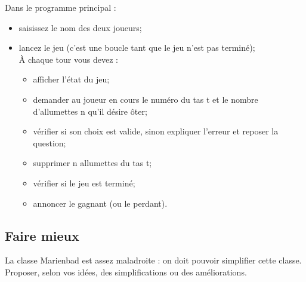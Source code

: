 \documentclass[a4paper,12pt,firamath,article]{nsi}
\begin{document}
Dans le programme principal :
\begin{itemize}
	\item 	saisissez le nom des deux joueurs;

\item lancez le jeu (c’est une boucle tant que le jeu n’est pas terminé);\\
 	À chaque tour vous devez :
\begin{itemize}
	\item 	afficher l'état du jeu;
	\item 	demander au joueur en cours le numéro du tas t et le nombre d’allumettes
	n qu’il désire ôter;
	\item vérifier si son choix est valide, sinon expliquer l’erreur et reposer la
	question;
	\item supprimer n allumettes du tas t;
	\item vérifier si le jeu est terminé;
	 \item annoncer le gagnant (ou le perdant).
\end{itemize}
\end{itemize}
\subsection*{Faire mieux}
La classe Marienbad est assez maladroite : on doit pouvoir simplifier cette classe. Proposer, selon vos idées, des simplifications ou des améliorations.
\end{document}
